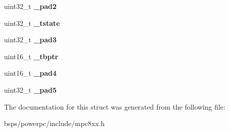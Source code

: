 \begin{DoxyCompactItemize}
uint32\+\_\+t {\bfseries \+\_\+pad2}
\item 
\mbox{\label{structm8xxSPIparms___a8e9e7f2b00a47292a9446678eddcb770}} 
uint32\+\_\+t {\bfseries \+\_\+tstate}
\item 
\mbox{\label{structm8xxSPIparms___a2a7cf7af9f3e979feb0290c60de76457}} 
uint32\+\_\+t {\bfseries \+\_\+pad3}
\item 
\mbox{\label{structm8xxSPIparms___a4e1341c75e615d40390e255cde7ed8fe}} 
uint16\+\_\+t {\bfseries \+\_\+tbptr}
\item 
\mbox{\label{structm8xxSPIparms___a501c70d7a964f8141a4a76a7be100351}} 
uint16\+\_\+t {\bfseries \+\_\+pad4}
\item 
\mbox{\label{structm8xxSPIparms___acbbc08a6e41302c23ed21b92a531ae98}} 
uint32\+\_\+t {\bfseries \+\_\+pad5}
\end{DoxyCompactItemize}


The documentation for this struct was generated from the following file\+:\begin{DoxyCompactItemize}
\item 
bsps/powerpc/include/mpc8xx.\+h\end{DoxyCompactItemize}
